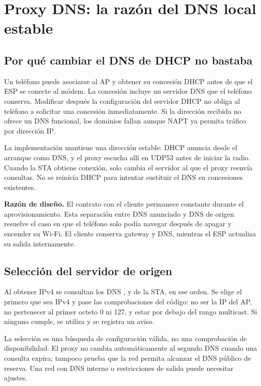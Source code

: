 \documentclass[11pt,a4paper]{article}
\newcommand{\code}[1]{\texttt{\detokenize{#1}}}
\newcommand{\decision}[1]{\par\textbf{Razón de diseño.} #1\par}
\begin{document}
\section{Proxy DNS: la razón del DNS local estable}
\label{sec:dns}

\subsection{Por qué cambiar el DNS de DHCP no bastaba}

Un teléfono puede asociarse al AP y obtener su concesión DHCP antes de
que el ESP se conecte al módem. La concesión incluye un servidor DNS que
el teléfono conserva. Modificar después la configuración del servidor
DHCP no obliga al teléfono a solicitar una concesión inmediatamente.
Si la dirección recibida no ofrece un DNS funcional, los dominios fallan
aunque NAPT ya permita tráfico por dirección IP.

La implementación mantiene una dirección estable: DHCP anuncia desde
el arranque \code{192.168.2.1} como DNS, y el proxy escucha allí en UDP53
antes de iniciar la radio. Cuando la STA obtiene conexión, solo cambia
el servidor al que el proxy reenvía consultas. No se reinicia DHCP para
intentar sustituir el DNS en concesiones existentes.

\decision{El contrato con el cliente permanece constante durante el
aprovisionamiento. Esta separación entre DNS anunciado y DNS de origen
resuelve el caso en que el teléfono solo podía navegar después de apagar
y encender su Wi-Fi. El cliente conserva gateway y DNS, mientras el ESP
actualiza su salida internamente.}

\subsection{Selección del servidor de origen}

Al obtener IPv4 se consultan los DNS \code{MAIN}, \code{BACKUP} y
\code{FALLBACK} de la STA, en ese orden. Se elige el primero que sea IPv4
y pase las comprobaciones del código: no ser la IP del AP, no pertenecer
al primer octeto 0 ni 127, y estar por debajo del rango multicast.
Si ninguno cumple, se utiliza \code{1.1.1.1} y se registra un aviso.

La selección es una búsqueda de configuración válida, no una comprobación
de disponibilidad. El proxy no cambia automáticamente al segundo DNS
cuando una consulta expira; tampoco prueba que la red permita alcanzar
el DNS público de reserva. Una red con DNS interno o restricciones de
salida puede necesitar ajustes.
\end{document}
